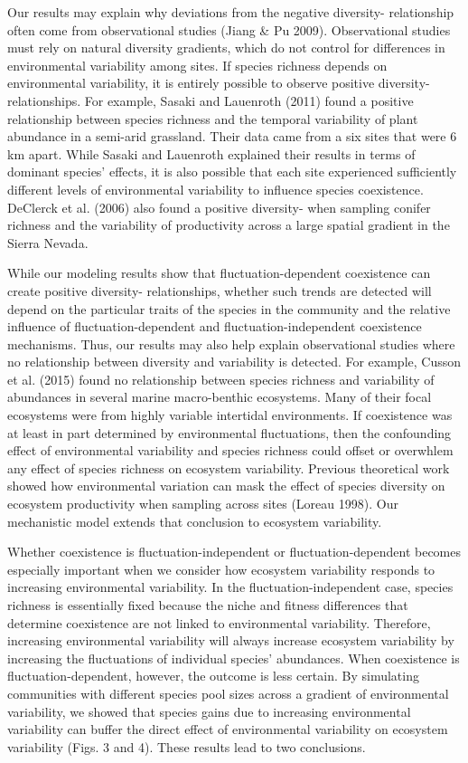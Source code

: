 \documentclass[12pt,]{article}
\begin{document}
Our results may explain why deviations from the negative
diversity- relationship often come from
observational studies (Jiang \& Pu 2009). Observational studies must
rely on natural diversity gradients, which do not control for
differences in environmental variability among sites. If species
richness depends on environmental variability, it is entirely possible
to observe positive diversity- relationships.
For example, Sasaki and Lauenroth (2011) found a positive relationship
between species richness and the temporal variability of plant abundance
in a semi-arid grassland. Their data came from a six sites that were 6
km apart. While Sasaki and Lauenroth explained their results in terms of
dominant species' effects, it is also possible that each site
experienced sufficiently different levels of environmental variability
to influence species coexistence. DeClerck et al. (2006) also found a
positive diversity- when sampling conifer
richness and the variability of productivity across a large spatial
gradient in the Sierra Nevada.

While our modeling results show that fluctuation-dependent coexistence
can create positive diversity- relationships,
whether such trends are detected will depend on the particular traits of
the species in the community and the relative influence of
fluctuation-dependent and fluctuation-independent coexistence
mechanisms. Thus, our results may also help explain observational
studies where no relationship between diversity and variability is
detected. For example, Cusson et al. (2015) found no relationship
between species richness and variability of abundances in several marine
macro-benthic ecosystems. Many of their focal ecosystems were from
highly variable intertidal environments. If coexistence was at least in
part determined by environmental fluctuations, then the confounding
effect of environmental variability and species richness could offset or
overwhlem any effect of species richness on ecosystem variability.
Previous theoretical work showed how environmental variation can mask
the effect of species diversity on ecosystem productivity when sampling
across sites (Loreau 1998). Our mechanistic model extends that
conclusion to ecosystem variability.

Whether coexistence is fluctuation-independent or fluctuation-dependent
becomes especially important when we consider how ecosystem variability
responds to increasing environmental variability. In the
fluctuation-independent case, species richness is essentially fixed
because the niche and fitness differences that determine coexistence are
not linked to environmental variability. Therefore, increasing
environmental variability will always increase ecosystem variability by
increasing the fluctuations of individual species' abundances. When
coexistence is fluctuation-dependent, however, the outcome is less
certain. By simulating communities with different species pool sizes
across a gradient of environmental variability, we showed that species
gains due to increasing environmental variability can buffer the direct
effect of environmental variability on ecosystem variability (Figs. 3
and 4). These results lead to two conclusions.
\end{document}

